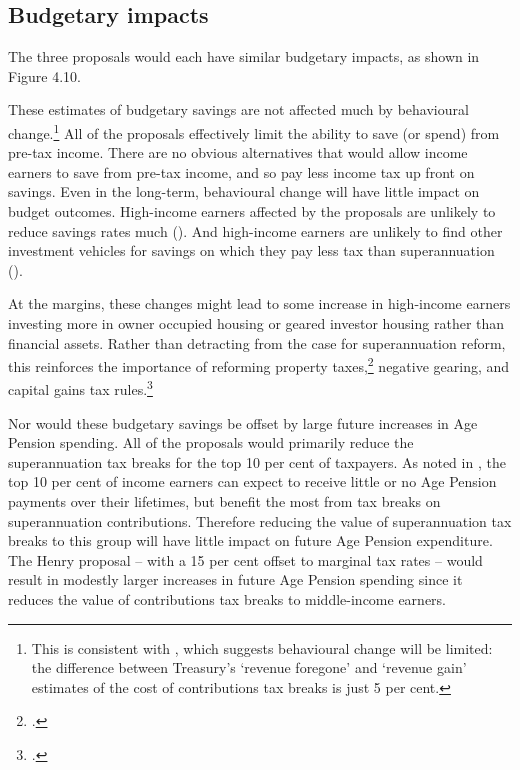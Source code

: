 \documentclass{grattanAlpha}
\begin{document}
\subsection{Budgetary impacts}
The three proposals would each have similar budgetary impacts, as shown in  Figure 4.10.  

These estimates of budgetary savings are not affected much by behavioural change.\footnote{This is consistent with \textcite{Treasury2015TES2014}, which suggests behavioural change will be limited: the difference between Treasury’s ‘revenue foregone’ and ‘revenue gain’ estimates of the cost of contributions tax breaks is just 5 per cent.}  All of the proposals effectively limit the ability to save (or spend) from pre-tax income. There are no obvious alternatives that would allow income earners to save from pre-tax income, and so pay less income tax up front on savings. Even in the long-term, behavioural change will have little impact on budget outcomes. High-income earners affected by the proposals are unlikely to reduce savings rates much (). And high-income earners are unlikely to find other investment vehicles for savings on which they pay less tax than superannuation (). 

At the margins, these changes might lead to some increase in high-income earners investing more in owner occupied housing or geared investor housing rather than financial assets. Rather than detracting from the case for superannuation reform, this reinforces the importance of reforming property taxes,\footcite{DaleyCoates2015PropertyTaxes}  negative gearing, and capital gains tax rules.\footnote{\textcites{DaleyMcGannonSavage2013BudgetPressures}{DaleyWood2016NG}.}

Nor would these budgetary savings be offset by large future increases in Age Pension spending. All of the proposals would primarily reduce the superannuation tax breaks for the top 10 per cent of taxpayers. As noted in , the top 10 per cent of income earners can expect to receive little or no Age Pension payments over their lifetimes, but benefit the most from tax breaks on superannuation contributions. Therefore reducing the value of superannuation tax breaks to this group will have little impact on future Age Pension expenditure. The Henry proposal – with a 15 per cent offset to marginal tax rates – would result in modestly larger increases in future Age Pension spending since it reduces the value of contributions tax breaks to middle-income earners.
\end{document}
